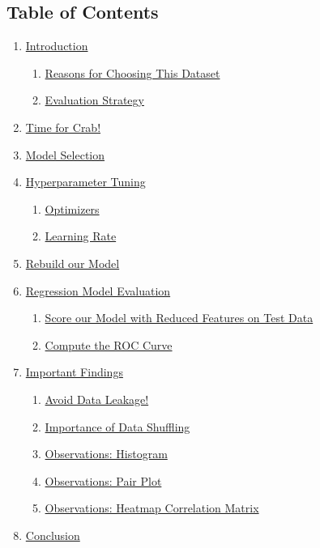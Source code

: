 \documentclass[11pt]{article}
\providecommand{\tightlist}{%
      \setlength{\itemsep}{0pt}\setlength{\parskip}{0pt}}
\begin{document}
    \subsection{Table of Contents}\label{table-of-contents}

\begin{enumerate}
\def\labelenumi{\arabic{enumi}.}
\tightlist
\item
  \hyperref[introduction]{Introduction}

  \begin{enumerate}
  \def\labelenumii{\arabic{enumii}.}
  \tightlist
  \item
    \hyperref[reasons-for-choosing-this-dataset]{Reasons for Choosing This Dataset}
  \item
    \hyperref[evaluation-strategy]{Evaluation Strategy}
  \end{enumerate}
\item
  \hyperref[time-for-crab]{Time for Crab!}
\item
  \hyperref[model-selection]{Model Selection}
\item
  \hyperref[hyperparameter-tuning]{Hyperparameter Tuning}

  \begin{enumerate}
  \def\labelenumii{\arabic{enumii}.}
  \tightlist
  \item
    \hyperref[optimizers]{Optimizers}
  \item
    \hyperref[learning-rate]{Learning Rate}
  \end{enumerate}
\item
  \hyperref[rebuild-our-model]{Rebuild our Model}
\item
  \hyperref[regression-model-evaluation]{Regression Model Evaluation}

  \begin{enumerate}
  \def\labelenumii{\arabic{enumii}.}
  \tightlist
  \item
    \hyperref[score-our-model-with-reduced-features-on-test-data]{Score our Model with Reduced Features on Test Data}
  \item
    \hyperref[compute-the-roc-curve]{Compute the ROC Curve}
  \end{enumerate}
\item
  \hyperref[important-findings]{Important Findings}

  \begin{enumerate}
  \def\labelenumii{\arabic{enumii}.}
  \tightlist
  \item
    \hyperref[avoid-data-leakage]{Avoid Data Leakage!}
  \item
    \hyperref[importance-of-data-shuffling]{Importance of Data Shuffling}
  \item
    \hyperref[observations-histogram]{Observations: Histogram}
  \item
    \hyperref[observations-pair-plot]{Observations: Pair Plot}
  \item
    \hyperref[observations-heatmap-correlation-matrix]{Observations: Heatmap Correlation Matrix}
  \end{enumerate}
\item
  \hyperref[conclusion]{Conclusion}
\end{enumerate}
\end{document}
